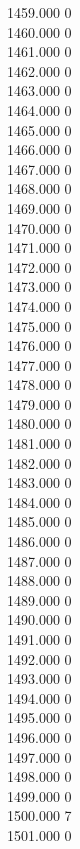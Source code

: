 { 1459.000	0 \\
 1460.000	0 \\
 1461.000	0 \\
 1462.000	0 \\
 1463.000	0 \\
 1464.000	0 \\
 1465.000	0 \\
 1466.000	0 \\
 1467.000	0 \\
 1468.000	0 \\
 1469.000	0 \\
 1470.000	0 \\
 1471.000	0 \\
 1472.000	0 \\
 1473.000	0 \\
 1474.000	0 \\
 1475.000	0 \\
 1476.000	0 \\
 1477.000	0 \\
 1478.000	0 \\
 1479.000	0 \\
 1480.000	0 \\
 1481.000	0 \\
 1482.000	0 \\
 1483.000	0 \\
 1484.000	0 \\
 1485.000	0 \\
 1486.000	0 \\
 1487.000	0 \\
 1488.000	0 \\
 1489.000	0 \\
 1490.000	0 \\
 1491.000	0 \\
 1492.000	0 \\
 1493.000	0 \\
 1494.000	0 \\
 1495.000	0 \\
 1496.000	0 \\
 1497.000	0 \\
 1498.000	0 \\
 1499.000	0 \\
 1500.000	7 \\
 1501.000	0 \\
}
